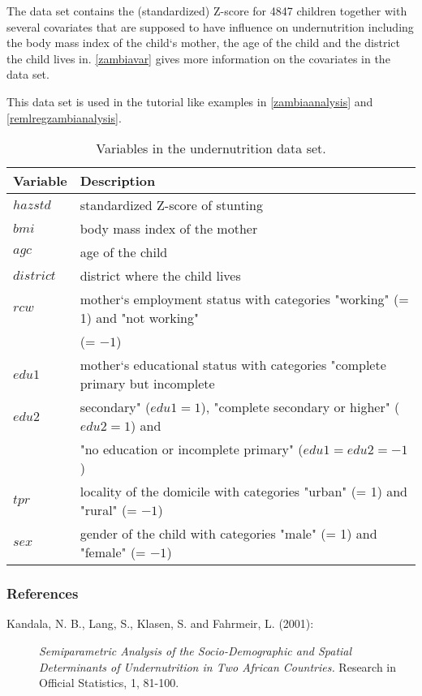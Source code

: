 The data set contains the (standardized) Z-score for 4847 children
together with several covariates that are supposed to have
influence on undernutrition including the body mass index of the
child`s mother, the age of the child and the district the child
lives in. \autoref{zambiavar} gives more information on the
covariates in the data set.

This data set is used in the tutorial like examples in
\autoref{zambiaanalysis} and \autoref{remlregzambianalysis}.

\begin{table}[|h|t|]
\begin{center}
\begin{tabular}{|l|l|}
 \hline
 {\bf Variable} & {\bf Description}\\
 \hline
 $hazstd$ & standardized Z-score of stunting\\
 $bmi$ & body mass index of the mother\\
 $agc$ & age of the child\\
 $district$ & district where the child lives\\
 $rcw$ & mother`s employment status with categories "working" (= 1) and "not working" \\
 & (= $-1$)\\
 $edu1$ & mother`s educational status with categories "complete primary but incomplete\\
 $edu2$ & secondary" ($edu1=1$), "complete secondary or higher" ($edu2=1$) and\\
 & "no education or incomplete primary" ($edu1=edu2=-1$)\\
 $tpr$ & locality of the domicile with categories "urban" (= 1) and "rural" (= $-1$)\\
 $sex$ & gender of the child with categories "male" (= 1) and
 "female" (= $-1$)\\
 \hline
\end{tabular}
{\em\caption{Variables in the undernutrition data set.
\label{zambiavar}}}
\end{center}
\end{table}

\subsubsection*{References}

\begin{description}
\item [Kandala, N. B., Lang, S., Klasen, S. and Fahrmeir, L. (2001):]{\it Semiparametric Analysis of
the Socio-Demographic and Spatial Determinants of Undernutrition
in Two African Countries.} Research in Official Statistics, 1,
81-100.
\end{description}
